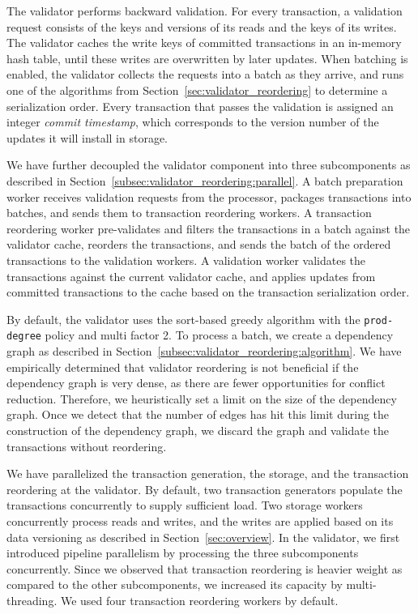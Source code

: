 The validator performs backward validation. For every transaction, a validation request consists of the keys and versions of its reads and the keys of its writes. The validator caches the write keys of committed transactions in an in-memory hash table, until these writes are overwritten by later updates. When batching is enabled, the validator collects the requests into a batch as they arrive, and runs one of the algorithms from Section~\ref{sec:validator_reordering} to determine a serialization order. Every transaction that passes the validation is assigned an integer \emph{commit timestamp}, which corresponds to the version number of the updates it will install in storage. 

We have further decoupled the validator component into three subcomponents as described in Section~\ref{subsec:validator_reordering:parallel}. A batch preparation worker receives validation requests from the processor, packages transactions into batches, and sends them to transaction reordering workers. A transaction reordering worker pre-validates and filters the transactions in a batch against the validator cache, reorders the transactions, and sends the batch of the ordered transactions to the validation workers. A validation worker validates the transactions against the current validator cache, and applies updates from committed transactions to the cache based on the transaction serialization order. 

By default, the validator uses the sort-based greedy algorithm with the \texttt{prod-degree} policy and multi factor 2. To process a batch, we create a dependency graph as described in Section~\ref{subsec:validator_reordering:algorithm}. We have empirically determined that validator reordering is not beneficial if the dependency graph is very dense, as there are fewer opportunities for conflict reduction. Therefore, we heuristically set a limit on the size of the dependency graph. Once we detect that the number of edges has hit this limit during the construction of the dependency graph, we discard the graph and validate the transactions without reordering. 

We have parallelized the transaction generation, the storage, and the transaction reordering at the validator. By default, two transaction generators populate the transactions concurrently to supply sufficient load. Two storage workers concurrently process reads and writes, and the writes are applied based on its data versioning as described in Section~\ref{sec:overview}. In the validator, we first introduced pipeline parallelism by processing the three subcomponents concurrently. Since we observed that transaction reordering is heavier weight as compared to the other subcomponents, we increased its capacity by multi-threading. We used four transaction reordering workers by default.

